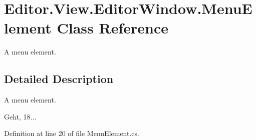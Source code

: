\section{Editor.\-View.\-Editor\-Window.\-Menu\-Element Class Reference}
\label{class_editor_1_1_view_1_1_editor_window_1_1_menu_element}


A menu element.  




\subsection{Detailed Description}
A menu element. 

Geht, 18... 

Definition at line 20 of file Menu\-Element.\-cs.

